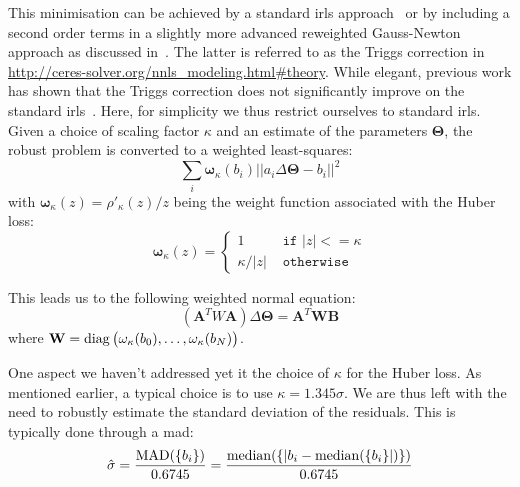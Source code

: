 This minimisation can be achieved by a standard \gls{irls} approach~\cite{Green:JRSSB:1984} or by including a second order terms in a slightly more advanced reweighted Gauss-Newton approach as discussed in~\cite{Triggs:VisAlg:2000}.
The latter is referred to as the Triggs correction in \url{http://ceres-solver.org/nnls_modeling.html#theory}. While elegant, previous work has shown that the Triggs correction does not significantly improve on the standard \gls{irls}~\cite{Zach:ECCV:2014,Zach:ECCV:2018}.
Here, for simplicity we thus restrict ourselves to standard \gls{irls}.
Given a choice of scaling factor $\kappa$ and an estimate of the parameters $\mathbf{\Theta}$, the robust problem is converted to a weighted least-squares:
\begin{equation}
\sum_i \mathbf{\omega}_\kappa(b_i) ||a_i \Delta\mathbf{\Theta} - b_i||^2
\end{equation}
with $\mathbf{\omega}_\kappa(z) = \rho'_\kappa(z) / z$ being the weight function associated with the Huber loss:
\begin{equation}
\mathbf{\omega}_\kappa(z) =
\begin{cases}
  1 &\texttt{ if } |z| <= \kappa \\
  \kappa / |z|  &\texttt{ otherwise }
\end{cases}
\end{equation}

This leads us to the following weighted normal equation:
\begin{equation}
(\mathbf{A}^T W \mathbf{A}) \Delta\mathbf{\Theta} = \mathbf{A}^T \mathbf{W} \mathbf{B}
\end{equation}
where $\mathbf{W} = \operatorname{diag}\big(\mathbf{\omega}_\kappa(b_0), \ldots, \mathbf{\omega}_\kappa(b_N)\big)$.

One aspect we haven't addressed yet it the choice of $\kappa$ for the Huber loss. As mentioned earlier, a typical choice is to use $\kappa=1.345\sigma$. We are thus left with the need to robustly estimate the standard deviation of the residuals. This is typically done through a \gls{mad}:
\begin{equation}
\hat{\sigma} = \frac{\operatorname{MAD}(\{b_i\})}{0.6745} = \frac{\operatorname{median}(\{|b_i-\operatorname{median}(\{b_i\}|)\})}{0.6745}
\end{equation}

